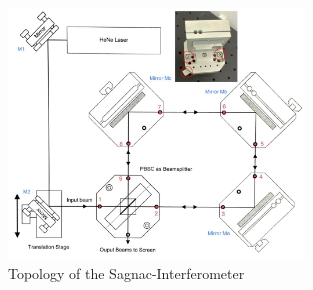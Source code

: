 \begin{figure}
    \centering
    \includegraphics[width=0.70\textwidth]{content/Bilder/Sagnac_Interferometer.jpeg}
    \caption{Topology of the Sagnac-Interferometer}
    \label{pic:Sagnac-Interferometer}
  \end{figure}

